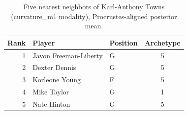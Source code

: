 \begin{table}[htbp]
  \centering\small
  \begin{tabular}{rllc}
    \toprule
    Rank & Player & Position & Archetype \\
    \midrule
    1 & Javon Freeman-Liberty & G & 5 \\
    2 & Dexter Dennis & G & 5 \\
    3 & Korleone Young & F & 5 \\
    4 & Mike Taylor & G & 1 \\
    5 & Nate Hinton & G & 5 \\
    \bottomrule
  \end{tabular}
  \caption{Five nearest neighbors of Karl-Anthony Towns (curvature_m1 modality), Procrustes-aligned posterior mean.}
  \label{tab:Karl_Anthony_Towns_neighbors_curvature_m1}
\end{table}

